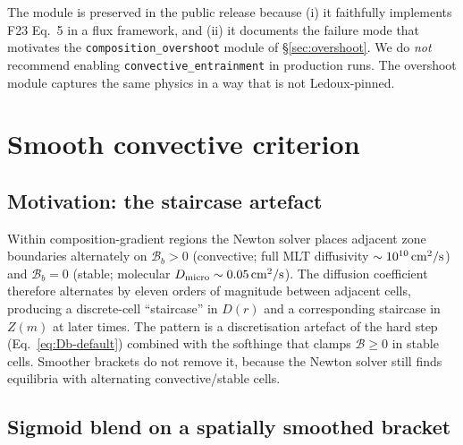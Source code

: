\documentclass{aastex631}
\newcommand{\Dmicro}{D_{\rm micro}}
\newcommand{\bracketb}{\mathcal{B}}
\begin{document}
The module is preserved in the public release because (i) it
faithfully implements F23 Eq.~5 in a flux framework, and (ii) it
documents the failure mode that motivates the
\texttt{composition\_overshoot} module of \S\ref{sec:overshoot}.
We do \emph{not} recommend enabling
\texttt{convective\_entrainment} in production runs.  The
overshoot module captures the same physics in a way that is not
Ledoux-pinned.

\section{Smooth convective criterion}\label{sec:smooth}

\subsection{Motivation: the staircase artefact}

Within composition-gradient regions the Newton solver places adjacent
zone boundaries alternately on $\bracketb{}_b > 0$ (convective; full
MLT diffusivity $\sim 10^{10}\,\rm cm^2/s$) and $\bracketb{}_b = 0$
(stable; molecular $\Dmicro \sim 0.05\,\rm cm^2/s$).  The
diffusion coefficient therefore alternates by eleven orders of
magnitude between adjacent cells, producing a discrete-cell
``staircase'' in $D(r)$ and a corresponding staircase in $Z(m)$ at
later times.  The pattern is a discretisation artefact of the
hard step (Eq.~\ref{eq:Db-default}) combined with the softhinge that
clamps $\bracketb \ge 0$ in stable cells.  Smoother brackets do not
remove it, because the Newton solver still finds equilibria with
alternating convective/stable cells.

\subsection{Sigmoid blend on a spatially smoothed bracket}
\end{document}
